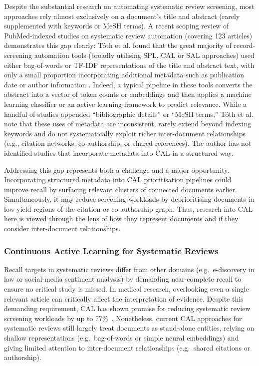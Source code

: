 \documentclass[10pt, english]{article}
\begin{document}
Despite the substantial research on automating systematic review screening, most approaches rely almost exclusively on a document’s title and abstract (rarely supplemented with keywords or MeSH terms). A recent scoping review of PubMed-indexed studies on systematic review automation (covering 123 articles) demonstrates this gap clearly: Tóth et al. found that the great majority of record-screening automation tools (broadly utilising SPL, CAL or SAL approaches) used either bag-of-words or TF-IDF representations of the title and abstract text, with only a small proportion incorporating additional metadata such as publication date or author information \cite{toth_automation_2024}. Indeed, a typical pipeline in these tools converts the abstract into a vector of token counts or embeddings and then applies a machine learning classifier or an active learning framework to predict relevance. While a handful of studies appended ``bibliographic details” or ``MeSH terms,” Tóth et al. note that these uses of metadata are inconsistent, rarely extend beyond indexing keywords and do not systematically exploit richer inter-document relationships (e.g., citation networks, co-authorship, or shared references). The author has not identified studies that incorporate metadata into CAL in a structured way. 

Addressing this gap represents both a challenge and a major opportunity. Incorporating structured metadata into CAL prioritisation pipelines could improve recall by surfacing relevant clusters of connected documents earlier. Simultaneously, it may reduce screening workloads by deprioritising documents in low-yield regions of the citation or co-authorship graph. Thus, research into CAL here is viewed through the lens of how they represent documents and if they consider inter-document relationships.  

\subsubsection{Continuous Active Learning for Systematic Reviews}

Recall targets in systematic reviews differ from other domains (e.g.\ e-discovery in law or social-media sentiment analysis) by demanding near-complete recall to ensure no critical study is missed. In medical research, overlooking even a single relevant article can critically affect the interpretation of evidence. Despite this demanding requirement, CAL has shown promise for reducing systematic review screening workloads by up to 77\%~\cite{van_der_vet_propagation_2016}. Nonetheless, current CAL approaches for systematic reviews still largely treat documents as stand-alone entities, relying on shallow representations (e.g.\ bag-of-words or simple neural embeddings) and giving limited attention to inter-document relationships (e.g.\ shared citations or authorship).
\end{document}
